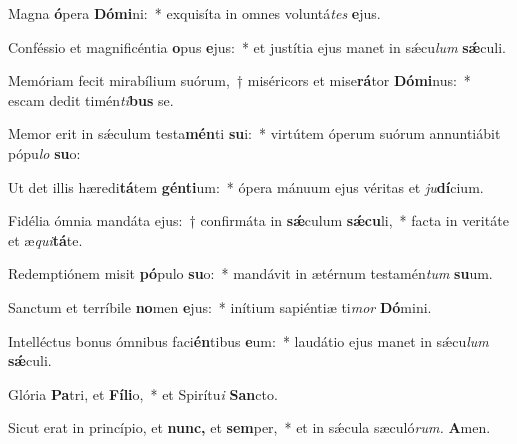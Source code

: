 \item Magna \textbf{ó}pera \textbf{Dó}\textbf{mi}ni:~* exquisíta in omnes voluntá\tinyhspace\textit{tes} \textbf{e}jus.
\item Conféssio et magnificéntia \textbf{o}pus \textbf{e}jus:~* et justítia ejus manet in sǽcu\textit{lum} \textbf{sǽ}culi.
\item Memóriam fecit mirabílium suórum,~† miséricors et mise\textbf{rá}tor \textbf{Dó}\textbf{mi}nus:~* escam dedit timén\tinyhspace\textit{ti}\textbf{bus} se.
\item Memor erit in sǽculum testa\textbf{mén}ti \textbf{su}i:~* virtútem óperum suórum annuntiábit pópu\tinyhspace\textit{lo} \textbf{su}o:
\item Ut det illis hæredi\textbf{tá}tem \textbf{gén}\textbf{ti}um:~* ópera mánuum ejus véritas et \textit{ju}\textbf{dí}cium.
\item Fidélia ómnia mandáta ejus:~† confirmáta in \textbf{sǽ}culum \textbf{sǽ}\textbf{cu}li,~* facta in veritáte et æ\tinyhspace\textit{qui}\textbf{tá}te.
\item Redemptiónem misit \textbf{pó}pulo \textbf{su}o:~* mandávit in ætérnum testamén\textit{tum} \textbf{su}um.
\item Sanctum et terríbile \textbf{no}men \textbf{e}jus:~* inítium sapiéntiæ ti\tinyhspace\textit{mor} \textbf{Dó}mini.
\item Intelléctus bonus ómnibus faci\textbf{én}tibus \textbf{e}um:~* laudátio ejus manet in sǽcu\tinyhspace\textit{lum} \textbf{sǽ}culi.
\item Glória \textbf{Pa}tri, et \textbf{Fí}\textbf{li}o,~* et Spirítu\tinyhspace\textit{i} \textbf{San}cto.
\item Sicut erat in princípio, et \textbf{nunc,} et \textbf{sem}per,~* et in sǽcula sæculó\textit{rum.} \textbf{A}men.
